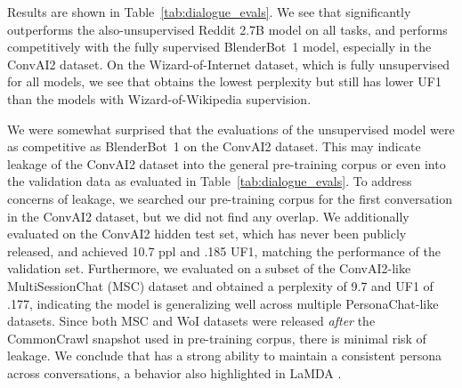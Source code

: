 Results are shown in Table~\ref{tab:dialogue_evals}. We see that \OPT{} significantly outperforms the also-unsupervised Reddit 2.7B model on all tasks, and performs competitively with the fully supervised BlenderBot~1 model, especially in the ConvAI2 dataset. On the Wizard-of-Internet dataset, which is fully unsupervised for all models, we see that \OPT{} obtains the lowest perplexity but still has lower UF1 than the models with Wizard-of-Wikipedia supervision.

We were somewhat surprised that the evaluations of the unsupervised \OPT{} model were as competitive as BlenderBot~1 on the ConvAI2 dataset. This may indicate leakage of the ConvAI2 dataset into the general pre-training corpus or even into the validation data as evaluated in Table~\ref{tab:dialogue_evals}. To address concerns of leakage, we searched our pre-training corpus for the first conversation in the ConvAI2 dataset, but we did not find any overlap.
We additionally evaluated \OPT{} on the ConvAI2 hidden test set, which has never been publicly released, and achieved 10.7 ppl and .185 UF1, matching the performance of the validation set. Furthermore, we evaluated \OPT{} on a subset of the ConvAI2-like MultiSessionChat (MSC) dataset \cite{xu2021beyond} and obtained a perplexity of 9.7 and UF1 of .177, indicating the model is generalizing well across multiple PersonaChat-like datasets. Since both MSC and WoI datasets were released \textit{after} the CommonCrawl snapshot used in pre-training corpus, there is minimal risk of leakage. We conclude that \OPT{} has a strong ability to maintain a consistent persona across conversations, a behavior also highlighted in LaMDA \cite{thoppilan2022lamda}.

